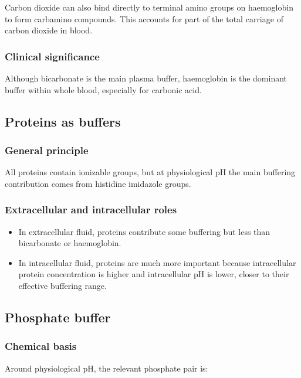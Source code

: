 \documentclass[11pt,a4paper]{article}
\begin{document}
Carbon dioxide can also bind directly to terminal amino groups on haemoglobin to form carbamino compounds. This accounts for part of the total carriage of carbon dioxide in blood.

\subsubsection{Clinical significance}

Although bicarbonate is the main plasma buffer, haemoglobin is the dominant buffer within whole blood, especially for carbonic acid.

\subsection{Proteins as buffers}

\subsubsection{General principle}

All proteins contain ionizable groups, but at physiological pH the main buffering contribution comes from histidine imidazole groups.

\subsubsection{Extracellular and intracellular roles}

\begin{itemize}
    \item In extracellular fluid, proteins contribute some buffering but less than bicarbonate or haemoglobin.
    \item In intracellular fluid, proteins are much more important because intracellular protein concentration is higher and intracellular pH is lower, closer to their effective buffering range.
\end{itemize}

\subsection{Phosphate buffer}

\subsubsection{Chemical basis}

Around physiological pH, the relevant phosphate pair is:
\end{document}
